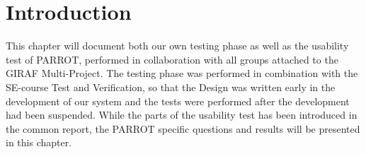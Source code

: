 \section{Introduction}
This chapter will document both our own testing phase as well as the usability test of PARROT, performed in collaboration with all groups attached to the GIRAF Multi-Project.
The testing phase was performed in combination with the SE-course Test and Verification, so that the Design was written early in the development of our system and the tests were performed after the development had been suspended.
While the parts of the usability test has been introduced in the common report, the PARROT specific questions and results will be presented in this chapter.